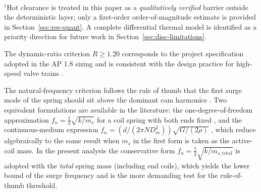 \begin{table}[!htbp]
\caption{Quantitative indicators associated with the preventive barriers of the BowTie diagram. The pass criteria follow conventional design rules in the internal-combustion-engine literature and the project specification of the AP 1.8 sizing.}\label{tbl:quant-criteria}
\centering
{}\\
{\footnotesize $^{\dagger}$Hot clearance is treated in this paper as a \emph{qualitatively verified} barrier outside the deterministic layer; only a first-order order-of-magnitude estimate is provided in Section~\ref{sec:res-quant}. A complete differential thermal model is identified as a priority direction for future work in Section~\ref{sec:disc-limitations}.}
\end{table}

The dynamic-ratio criterion $R\geq 1.20$ corresponds to the project
specification adopted in the AP 1.8 sizing and is consistent with
the design practice for high-speed valve trains
\citep{heywood1988,taylor1985,heisler2002}.

The natural-frequency criterion follows the rule of thumb that the
first surge mode of the spring should sit above the dominant cam
harmonics \citep{heywood1988}. Two equivalent formulations are
available in the literature: the one-degree-of-freedom approximation
$f_{n} = \tfrac{1}{2}\sqrt{k/m_{s}}$ for a coil spring with both ends
fixed \citep[\S~10-26]{shigley2020}, and the continuous-medium
expression
$f_{n} = (d/(2\pi N D_{m}^{2}))\sqrt{G/(2\rho)}$
\citep[\S~6.6]{heywood1988}, which reduce algebraically to the same
result when $m_{s}$ in the first form is taken as the active-coil
mass. In the present analysis the conservative form
$f_{n} = \tfrac{1}{2}\sqrt{k/m_{s,\mathrm{total}}}$ is adopted with the
\emph{total} spring mass (including end coils), which yields the
lower bound of the surge frequency and is the more demanding test for
the rule-of-thumb threshold.

